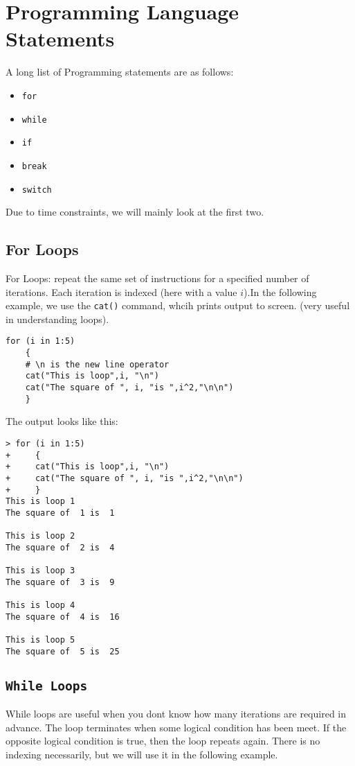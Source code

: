 \documentclass[a4paper,12pt]{article}
\begin{document}
\tableofcontents


\section{Programming Language Statements}
A long list of Programming statements are as follows:
\begin{itemize}
\item \texttt{for}
\item \texttt{while}
\item \texttt{if}
\item \texttt{break}
\item \texttt{switch}
\end{itemize}
Due to time constraints, we will mainly look at the first two.

\subsection{For Loops}
For Loops: repeat the same set of instructions for a specified number of iterations. Each iteration is indexed (here with a value $i$).In the following example,  we use the \texttt{cat()} command, whcih prints output to screen. (very useful in understanding loops).

\begin{framed}
\begin{verbatim}
for (i in 1:5)
    {
    # \n is the new line operator
    cat("This is loop",i, "\n")
    cat("The square of ", i, "is ",i^2,"\n\n")
    }
\end{verbatim}
\end{framed}

The output looks like this:
\begin{verbatim}
> for (i in 1:5)
+     {
+     cat("This is loop",i, "\n")
+     cat("The square of ", i, "is ",i^2,"\n\n")
+     }
This is loop 1 
The square of  1 is  1 

This is loop 2 
The square of  2 is  4 

This is loop 3 
The square of  3 is  9 

This is loop 4 
The square of  4 is  16 

This is loop 5 
The square of  5 is  25 
\end{verbatim}

\newpage
\subsection{\texttt{While Loops}}
While loops are useful when you dont know how many iterations are required in advance. The loop terminates when some logical condition has been  meet. If the opposite logical condition  is true, then the loop repeats again. There is no indexing necessarily, but we will use it in the following example.
\end{document}
